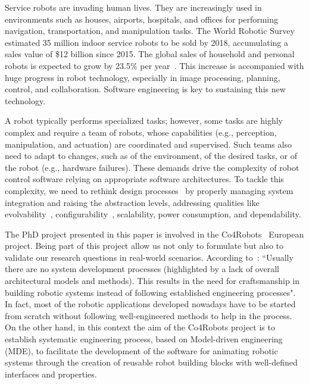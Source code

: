 Service robots are invading human lives. They are increasingly used in environments such as houses, airports, hospitals, and offices for performing navigation, transportation, and manipulation tasks. 
The World Robotic Survey~\cite{wrs:online} estimated 35 million indoor service robots to be sold by 2018, accumulating a sales value of \$12 billion since 2015. 
The global sales of household and personal robots is expected to grow by 23.5\% per year~\cite{sheng:online}. 
This increase is accompanied with huge progress in robot technology, especially in image processing, planning, control, and collaboration. Software engineering is key to sustaining this new technology.

A robot typically performs specialized tasks; however, some tasks are highly complex and require a team of robots, whose capabilities (e.g., perception, manipulation, and actuation) are coordinated and supervised. 
Such teams also need to adapt to changes, such as of the environment, of the desired tasks, or of the robot (e.g., hardware failures). 
These demands drive the complexity of robot control software relying on appropriate software architectures. 
To tackle this complexity, we need to rethink design processes~\cite{Lee2008} by properly managing system integration and raising the abstraction levels, addressing qualities like evolvability~\cite{Perez2008}, configurability~\cite{Gamez2013563}, scalability, power consumption, and dependability.

The PhD project presented in this paper is involved in the Co4Robots~\cite{co4robots} European project.
Being part of this project allow us not only to formulate but also to validate our research questions in real-world scenarios.
According to~\cite{roadmap}: ``Usually there are no system development processes (highlighted by a lack of overall architectural models and methods). 
This results in the need for craftsmanship in building robotic systems instead of following established engineering processes".
In fact, most of the robotic applications developed nowadays have to be started from scratch without following well-engineered methods to help in the process.
On the other hand, in this context the aim of the Co4Robots project is to establish systematic engineering process, based on Model-driven engineering (MDE), to facilitate the development of the software for animating robotic systems through the creation of reusable robot building blocks with well-defined interfaces and properties. 

